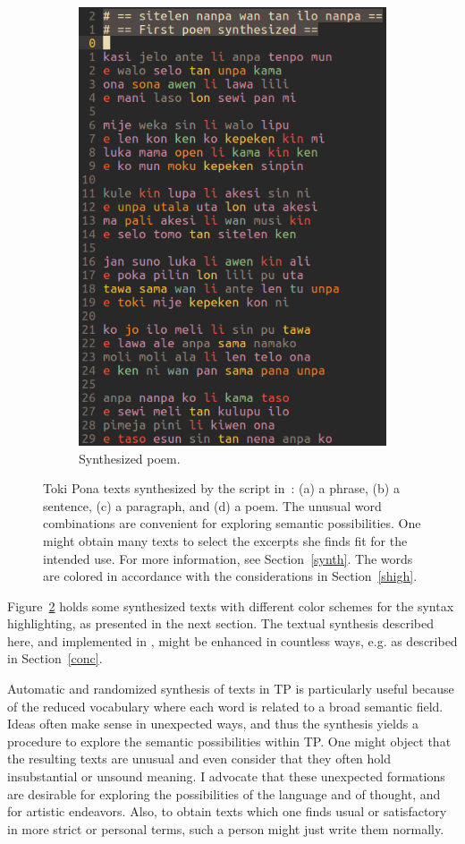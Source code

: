 \begin{figure}
\begin{subfigure}{.6\textwidth}
        \includegraphics[width=.8\linewidth]{figs/poem_}\vspace{-0.15cm}
          \caption{Synthesized poem.}
            \label{fig:sfig2}
  \end{subfigure}
  \caption{Toki Pona texts synthesized by the  script
  in~\cite{tokipona}: (a) a phrase, (b) a sentence, (c) a paragraph,
  and (d) a poem.
  The unusual word combinations are convenient for exploring semantic
  possibilities.
  One might obtain many texts to select the excerpts
  she finds fit for the intended use.
  For more information, see Section~\ref{synth}.
  The words are colored in accordance with the considerations
  in Section~\ref{shigh}.}
  \label{fig:syn}
\end{figure}

Figure~\ref{fig:syn} holds some synthesized texts
with different color schemes for the syntax highlighting,
as presented in the next section.
The textual synthesis described here,
and implemented in ,
might be enhanced in countless ways,
e.g. as described in Section~\ref{conc}.

Automatic and randomized synthesis of texts in TP is particularly
useful because of the reduced vocabulary where each word is related
to a broad semantic field.
Ideas often make sense in unexpected ways, and thus
the synthesis yields a procedure to 
explore the semantic possibilities within TP.
One might object that the resulting texts are unusual 
and even consider that they often hold insubstantial or unsound meaning.
I advocate that these unexpected formations are desirable
for exploring the possibilities of the language and of thought,
and for artistic endeavors.
Also, to obtain texts which one finds usual or satisfactory
in more strict or personal terms, such a person might just write
them normally.

